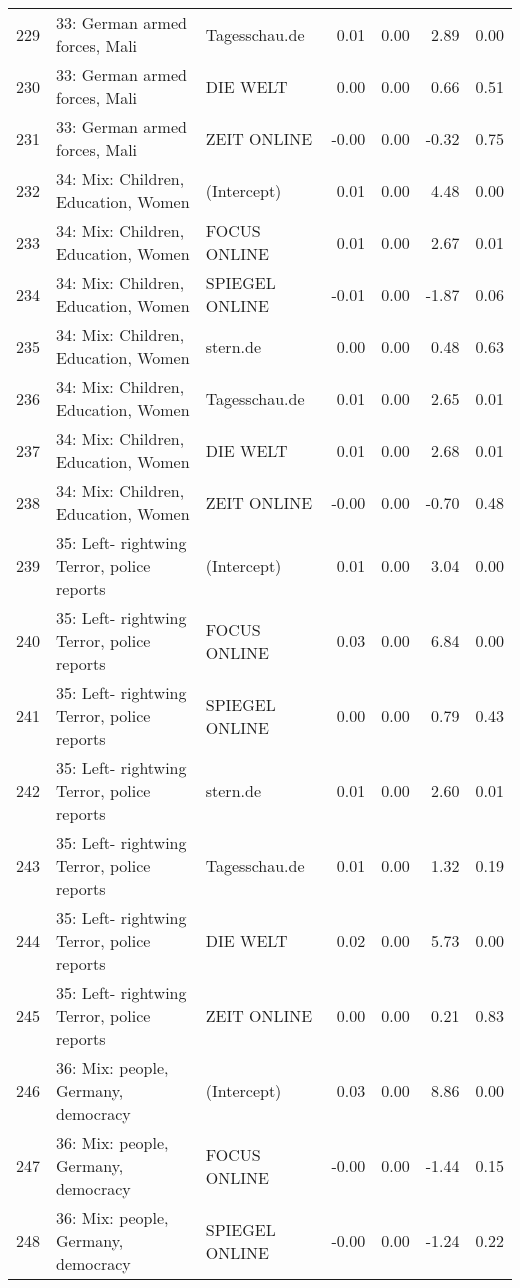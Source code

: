 \begin{table}[ht]
{\begin{tabular}{rllrrrr}
  229 & 33: German armed forces, Mali & Tagesschau.de & 0.01 & 0.00 & 2.89 & 0.00 \\ 
  230 & 33: German armed forces, Mali & DIE WELT & 0.00 & 0.00 & 0.66 & 0.51 \\ 
  231 & 33: German armed forces, Mali & ZEIT ONLINE & -0.00 & 0.00 & -0.32 & 0.75 \\ 
  232 & 34: Mix: Children, Education, Women & (Intercept) & 0.01 & 0.00 & 4.48 & 0.00 \\ 
  233 & 34: Mix: Children, Education, Women & FOCUS ONLINE & 0.01 & 0.00 & 2.67 & 0.01 \\ 
  234 & 34: Mix: Children, Education, Women & SPIEGEL ONLINE & -0.01 & 0.00 & -1.87 & 0.06 \\ 
  235 & 34: Mix: Children, Education, Women & stern.de & 0.00 & 0.00 & 0.48 & 0.63 \\ 
  236 & 34: Mix: Children, Education, Women & Tagesschau.de & 0.01 & 0.00 & 2.65 & 0.01 \\ 
  237 & 34: Mix: Children, Education, Women & DIE WELT & 0.01 & 0.00 & 2.68 & 0.01 \\ 
  238 & 34: Mix: Children, Education, Women & ZEIT ONLINE & -0.00 & 0.00 & -0.70 & 0.48 \\ 
  239 & 35: Left- rightwing Terror, police reports & (Intercept) & 0.01 & 0.00 & 3.04 & 0.00 \\ 
  240 & 35: Left- rightwing Terror, police reports & FOCUS ONLINE & 0.03 & 0.00 & 6.84 & 0.00 \\ 
  241 & 35: Left- rightwing Terror, police reports & SPIEGEL ONLINE & 0.00 & 0.00 & 0.79 & 0.43 \\ 
  242 & 35: Left- rightwing Terror, police reports & stern.de & 0.01 & 0.00 & 2.60 & 0.01 \\ 
  243 & 35: Left- rightwing Terror, police reports & Tagesschau.de & 0.01 & 0.00 & 1.32 & 0.19 \\ 
  244 & 35: Left- rightwing Terror, police reports & DIE WELT & 0.02 & 0.00 & 5.73 & 0.00 \\ 
  245 & 35: Left- rightwing Terror, police reports & ZEIT ONLINE & 0.00 & 0.00 & 0.21 & 0.83 \\ 
  246 & 36: Mix: people, Germany, democracy & (Intercept) & 0.03 & 0.00 & 8.86 & 0.00 \\ 
  247 & 36: Mix: people, Germany, democracy & FOCUS ONLINE & -0.00 & 0.00 & -1.44 & 0.15 \\ 
  248 & 36: Mix: people, Germany, democracy & SPIEGEL ONLINE & -0.00 & 0.00 & -1.24 & 0.22 \\ 

\end{tabular}}
\end{table}
